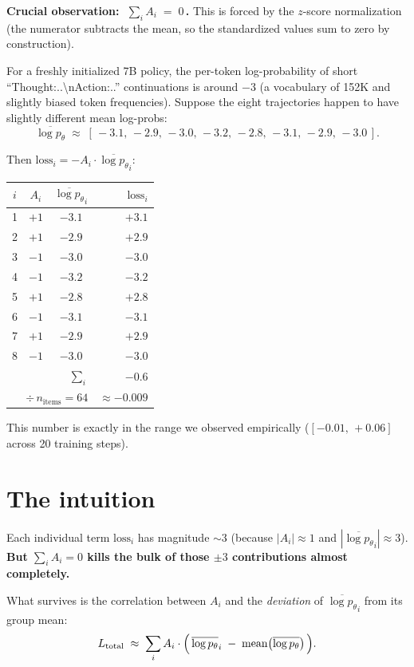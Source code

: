 \documentclass[11pt,a4paper]{article}
\begin{document}
\textbf{Crucial observation: $\;\sum_i A_i \;=\; 0\,$.}\;\;
This is forced by the $z$-score normalization (the numerator subtracts the
mean, so the standardized values sum to zero by construction).

For a freshly initialized 7B policy, the per-token log-probability of
short ``Thought:..\textbackslash nAction:..'' continuations is around $-3$
(a vocabulary of 152K and slightly biased token frequencies). Suppose the
eight trajectories happen to have slightly different mean log-probs:
\[
\overline{\log p_\theta} \;\approx\; [\,-3.1,\,-2.9,\,-3.0,\,-3.2,\,-2.8,\,-3.1,\,-2.9,\,-3.0\,].
\]

Then $\text{loss}_i = -A_i \cdot \overline{\log p_\theta}_i$:
\begin{center}
\begin{tabular}{cccr}
\toprule
$i$ & $A_i$ & $\overline{\log p_\theta}_i$ & $\text{loss}_i$ \\
\midrule
1 & $+1$ & $-3.1$ & $+3.1$ \\
2 & $+1$ & $-2.9$ & $+2.9$ \\
3 & $-1$ & $-3.0$ & $-3.0$ \\
4 & $-1$ & $-3.2$ & $-3.2$ \\
5 & $+1$ & $-2.8$ & $+2.8$ \\
6 & $-1$ & $-3.1$ & $-3.1$ \\
7 & $+1$ & $-2.9$ & $+2.9$ \\
8 & $-1$ & $-3.0$ & $-3.0$ \\
\midrule
\multicolumn{3}{r}{$\sum_i$} & $-0.6$ \\
\multicolumn{3}{r}{$\div\,n_{\text{items}}\!=\!64$} & $\boxed{\approx -0.009}$ \\
\bottomrule
\end{tabular}
\end{center}

This number is exactly in the range we observed empirically
($[-0.01,\,+0.06]$ across 20 training steps).

\section{The intuition}

Each individual term $\text{loss}_i$ has magnitude $\sim 3$ (because
$|A_i| \approx 1$ and $|\overline{\log p_\theta}_i| \approx 3$).
\textbf{But $\sum_i A_i = 0$ kills the bulk of those $\pm 3$
contributions almost completely.}

What survives is the correlation between $A_i$ and the \emph{deviation} of
$\overline{\log p_\theta}_i$ from its group mean:
\begin{equation}
L_{\text{total}} \;\approx\; \sum_i A_i \cdot \Bigl(\,\overline{\log p_\theta}_i \;-\; \mathrm{mean}\bigl(\overline{\log p_\theta}\bigr)\,\Bigr).
\label{eq:residual}
\end{equation}
\end{document}
